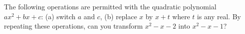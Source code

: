 The following operations are permitted with the quadratic polynomial $ax^2 + bx + c$: (a) switch $a$ and $c$, (b) replace $x$ by $x + t$ where $t$ is any real. By repeating these operations, can you transform $x^2 - x - 2$ into $x^2 - x - 1$?

